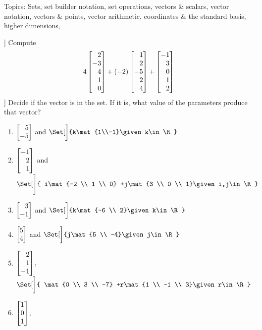 \begin{exercises}
		Topics:
		Sets, set builder notation, set operations,
		vectors \& scalars, vector notation, vectors \& points, vector arithmetic,
		coordinates \& the standard basis, higher dimensions,
	\begin{problist}
		\prob[\beezer[VO.C10]]
		Compute
		\[
			4\mat{2\\-3\\4\\1\\0}+
			(-2)\mat{1\\2\\-5\\2\\4}+
			\mat{-1\\3\\0\\1\\2}
		\]
		\prob[\hefferon[2.21,2.22]]
			Decide if the vector is in the set. If it is, what value of the
			parameters produce that vector?
			\begin{enumerate}
				\item $\mat{5\\-5}$ and $\Set[\bigg]{k\mat{1\\-1}\given k\in\R}$
				\item $\mat{-1 \\ 2 \\ 1}$ and
					$\Set[\Bigg]{
						i\mat{-2 \\ 1 \\ 0} +j\mat{3 \\ 0 \\ 1}\given i,j\in\R
          }$
					\item
						$\mat{3 \\ -1}$ and $\Set[\bigg]{k\mat{-6 \\ 2}\given k\in\R}$
					\item
						$\mat{5 \\ 4}$ and $\Set[\bigg]{j\mat{5 \\ -4}\given j\in\R}$
					\item $\mat{2 \\ 1 \\ -1}$,
						$\Set[\bigg]{
							\mat{0 \\ 3 \\ -7}
							+r\mat{1 \\ -1 \\ 3}\given r\in\R
						}$
					\item $\mat{1 \\ 0 \\ 1}$,

\end{enumerate}
\end{problist}
\end{exercises}
